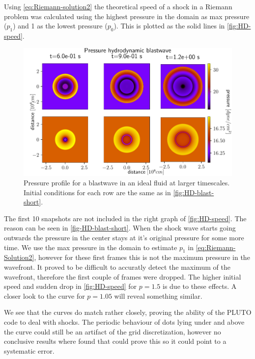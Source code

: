 Using \cref{eq:Riemann-solution2} the theoretical speed of a shock in a Riemann problem was calculated using the highest pressure in the domain as max pressure ($p_1$) and 1 as the lowest pressure ($p_0$). This is plotted as the solid lines in \cref{fig:HD-speed}.

\begin{figure}[H]
	\centering
	\includegraphics[width=\linewidth]{images/HD-blast-prs-2.pdf}
	\caption{Pressure profile for a blastwave in an ideal fluid at larger timescales. Initial conditions for each row are the same as in \cref{fig:HD-blast-short}.}
	\label{fig:HD-blast-long}
\end{figure}

The first 10 snapshots are not included in the right graph of \cref{fig:HD-speed}. 
The reason can be seen in \cref{fig-HD-blast-short}. 
When the shock wave starts going outwards the pressure in the center stays at it's original pressure for some more time.
We use the max pressure in the domain to estimate $p_1$ in \cref{eq:Riemann-Solution2}, however for these first frames this is not the maximum pressure in the wavefront.
It proved to be difficult to accuratly detect the maximum of the wavefront, therefore the first couple of frames were dropped.
The higher initial speed and sudden drop in \cref{fig:HD-speed} for $p=1.5$ is due to these effects. A closer look to the curve for $p=1.05$ will reveal something similar.

We see that the curves do match rather closely, proving the ability of the PLUTO code to deal with shocks. 
The periodic behaviour of dots lying under and above the curve could still be an artifact of the grid discretization, however no conclusive results where found that could prove this so it could point to a systematic error.

